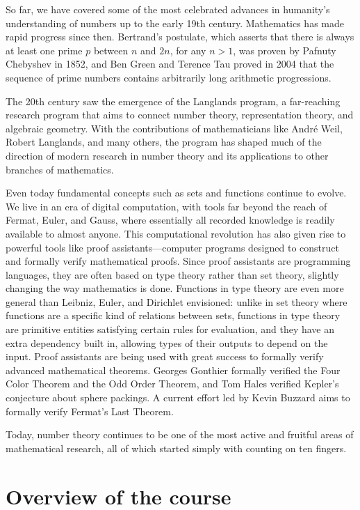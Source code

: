 \documentclass{article}
\theoremstyle{definition}
\theoremstyle{remark}
\begin{document}
So far, we have covered some of the most celebrated advances in humanity's understanding of numbers up to the early 19th century. Mathematics has made rapid progress since then. Bertrand's postulate, which asserts that there is always at least one prime $p$ between $n$ and $2n$, for any $n>1$, was proven by Pafnuty Chebyshev in 1852, and Ben Green and Terence Tau proved in 2004 that the sequence of prime numbers contains arbitrarily long arithmetic progressions.

The 20th century saw the emergence of the Langlands program, a far-reaching research program that aims to connect number theory, representation theory, and algebraic geometry. With the contributions of mathematicians like André Weil, Robert Langlands, and many others, the program has shaped much of the direction of modern research in number theory and its applications to other branches of mathematics.

Even today fundamental concepts such as sets and functions continue to evolve. We live in an era of digital computation, with tools far beyond the reach of Fermat, Euler, and Gauss, where essentially all recorded knowledge is readily available to almost anyone. This computational revolution has also given rise to powerful tools like proof assistants—computer programs designed to construct and formally verify mathematical proofs. Since proof assistants are programming languages, they are often based on type theory rather than set theory, slightly changing the way mathematics is done. Functions in type theory are even more general than Leibniz, Euler, and Dirichlet envisioned: unlike in set theory where functions are a specific kind of relations between sets, functions in type theory are primitive entities satisfying certain rules for evaluation, and they have an extra dependency built in, allowing types of their outputs to depend on the input. Proof assistants are being used with great success to formally verify advanced mathematical theorems. Georges Gonthier formally verified the Four Color Theorem and the Odd Order Theorem, and Tom Hales verified Kepler's conjecture about sphere packings. A current effort led by Kevin Buzzard aims to formally verify Fermat's Last Theorem.

Today, number theory continues to be one of the most active and fruitful areas of mathematical research, all of which started simply with counting on ten fingers.

\section{Overview of the course}
\end{document}
